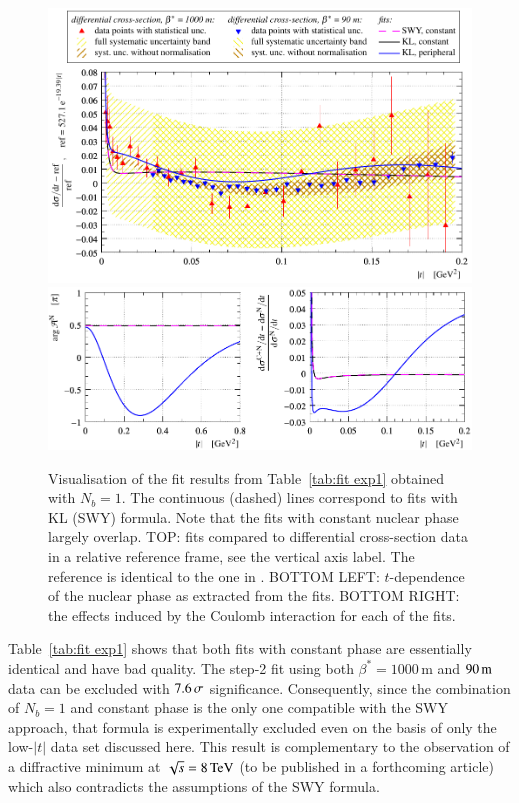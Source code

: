 \begin{figure}
\begin{center}
\includegraphics{fig/fit_exp1/t_dist_rel_with_fit.pdf}
\includegraphics{fig/fit_exp1/phase_cni_effect.pdf}
\caption{Visualisation of the fit results from Table~\ref{tab:fit exp1} obtained with $N_b=1$. The continuous (dashed) lines correspond to fits with KL (SWY) formula. Note that the fits with constant nuclear phase largely overlap.
TOP: fits compared to differential cross-section data in a relative reference frame, see the vertical axis label. The reference is identical to the one in \cite{8tev-90m}. 
BOTTOM LEFT: $t$-dependence of the nuclear phase as extracted from the fits.
BOTTOM RIGHT: the effects induced by the Coulomb interaction for each of the fits.
}%
\label{fig:fit exp1}
\end{center}
\end{figure}

Table~\ref{tab:fit exp1} shows that both fits with constant phase are essentially identical and have bad quality. The step-2 fit using both $\beta^*=1000$\,m and $90\,{\rm m}$ data can be excluded with $7.6\,{\rm \sigma}$ significance. Consequently, since the combination of $N_b=1$ and constant phase is the only one compatible with the SWY approach, that formula is experimentally excluded even on the basis of only the low-$|t|$ data set discussed here. This result is complementary to the observation of a diffractive minimum at $\sqrt{s} = 8\,{\rm TeV}$ (to be published in a forthcoming article) which also contradicts the assumptions of the SWY formula.

